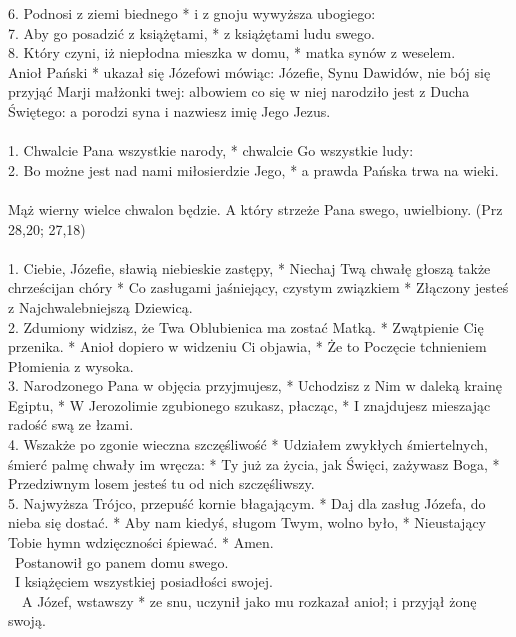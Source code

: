 6. Podnosi z ziemi biednego * i z gnoju wywyższa ubogiego:\\
7. Aby go posadzić z książętami, * z książętami ludu swego.\\
8. Który czyni, iż niepłodna mieszka w domu, * matka synów z weselem.\\
 Anioł Pański * ukazał się Józefowi mówiąc: Józefie, Synu Dawidów, nie bój się przyjąć Marji małżonki twej: albowiem co się w niej narodziło jest z Ducha Świętego: a porodzi syna i nazwiesz imię Jego Jezus.\\
\\
1. Chwalcie Pana wszystkie narody, * chwalcie Go wszystkie ludy:\\
2. Bo możne jest nad nami miłosierdzie Jego, * a prawda Pańska trwa na wieki.\\
\\
Mąż wierny wielce chwalon będzie. A który strzeże Pana swego, uwielbiony. (Prz 28,20; 27,18)\\
\\
1. Ciebie, Józefie, sławią niebieskie zastępy, * Niechaj Twą chwałę głoszą także chrześcijan chóry * Co zasługami jaśniejący, czystym związkiem * Złączony jesteś z Najchwalebniejszą Dziewicą.\\
2. Zdumiony widzisz, że Twa Oblubienica ma zostać Matką. * Zwątpienie Cię przenika. * Anioł dopiero w widzeniu Ci objawia, * Że to Poczęcie tchnieniem Płomienia z wysoka.\\
3. Narodzonego Pana w objęcia przyjmujesz, * Uchodzisz z Nim w daleką krainę Egiptu, * W Jerozolimie zgubionego szukasz, płacząc, * I znajdujesz mieszając radość swą ze łzami.\\
4. Wszakże po zgonie wieczna szczęśliwość * Udziałem zwykłych śmiertelnych, śmierć palmę chwały im wręcza: * Ty już za życia, jak Święci, zażywasz Boga, * Przedziwnym losem jesteś tu od nich szczęśliwszy.\\
5. Najwyższa Trójco, przepuść kornie błagającym. * Daj dla zasług Józefa, do nieba się dostać. * Aby nam kiedyś, sługom Twym, wolno było, * Nieustający Tobie hymn wdzięczności śpiewać. * Amen.\\
~Postanowił go panem domu swego.\\
~I książęciem wszystkiej posiadłości swojej.\\
~~A Józef, wstawszy * ze snu, uczynił jako mu rozkazał anioł; i przyjął żonę swoją.\\
